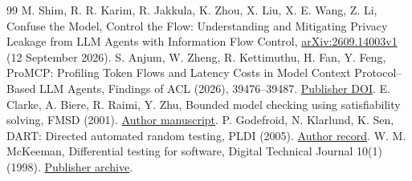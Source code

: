 \documentclass[11pt,a4paper]{article}
\begin{document}
\begin{thebibliography}{99}
 M. Shim, R. R. Karim, R. Jakkula, K. Zhou, X. Liu, X. E. Wang, Z. Li, Confuse the Model, Control the Flow: Understanding and Mitigating Privacy Leakage from LLM Agents with Information Flow Control, \href{https://arxiv.org/abs/2609.14003v1}{arXiv:2609.14003v1} (12 September 2026).
 S. Anjum, W. Zheng, R. Kettimuthu, H. Fan, Y. Feng, ProMCP: Profiling Token Flows and Latency Costs in Model Context Protocol--Based LLM Agents, Findings of ACL (2026), 39476--39487. \href{https://doi.org/10.18653/v1/2026.findings-acl.1967}{Publisher DOI}.
 E. Clarke, A. Biere, R. Raimi, Y. Zhu, Bounded model checking using satisfiability solving, FMSD (2001). \href{https://fmv.jku.at/papers/ClarkeBiereRaimiZhu-FMSD-19-1-2001.pdf}{Author manuscript}.
 P. Godefroid, N. Klarlund, K. Sen, DART: Directed automated random testing, PLDI (2005). \href{https://osl.cs.illinois.edu/publications/conf/pldi/GodefroidKS05.html}{Author record}.
 W. M. McKeeman, Differential testing for software, Digital Technical Journal 10(1) (1998). \href{https://vmssoftware.com/docs/dtj-v10-01-1998.pdf}{Publisher archive}.
\end{thebibliography}
\end{document}
